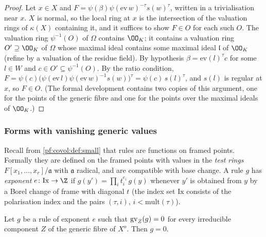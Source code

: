 \begin{proof}
Let $x\in X$ and $F=\psi(\beta)\psi(\mathrm{ev}\,w)^{-\tau}s(w)^\tau$, written in a trivialisation near
$x$. $X$ is normal, so the local ring at $x$ is the intersection of the valuation rings of $\kappa(X)$
containing it, and it suffices to show $F\in O$ for each such $O$. The valuation ring
$\psi^{-1}(O)$ of $\Omega$ contains $\OO_K$; it contains a valuation ring $O'\supseteq\OO_K$ of $\Omega$
whose maximal ideal contains some maximal ideal $\mathfrak l$ of $\OO_K$ (refine by a valuation of the
residue field). By hypothesis $\beta=\mathrm{ev}(l)^\tau c$ for some $l\in W$ and $c\in O'\subseteq\psi^{-1}(O)$.
By the ratio condition, $F=\psi(c)\bigl(\psi(\mathrm{ev}\,l)\psi(\mathrm{ev}\,w)^{-1}s(w)\bigr)^\tau=
\psi(c)\,s(l)^\tau$, and $s(l)$ is regular at $x$, so $F\in O$.
(The formal development contains two copies of this argument, one for the points of the generic fibre
and one for the points over the maximal ideals of $\OO_K$.)
\end{proof}

\subsubsection*{Forms with vanishing generic values}
Recall from \cref{pf:covol:def:small} that rules are functions on framed points. Formally they are
defined on the framed points with values in the \emph{test rings} $F[x_1,\dots,x_r]/\mathfrak a$ with
$\mathfrak a$ radical, and are compatible with base change. A rule $g$ has \emph{exponent}
$e\colon\mathrm{Ix}\to\Z$ if $g(y')=\prod_it_i^{e_i}\,g(y)$ whenever $y'$ is obtained from $y$ by a Borel
change of frame with diagonal $t$ (the index set $\mathrm{Ix}$ consists of the polarisation index and the
pairs $(\tau,i)$, $i<\mathrm{mult}(\tau)$).

\begin{lemma}\label{pf:covol:lem:secz}
Let $g$ be a rule of exponent $e$ such that $\operatorname{gv}_Z(g)=0$ for every irreducible component $Z$ of the
generic fibre of $X^o$. Then $g=0$.
%
\end{lemma}

